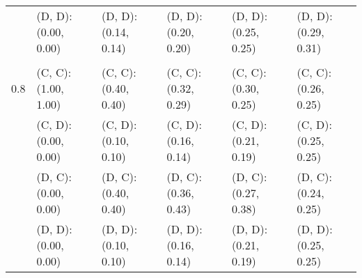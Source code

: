 \begin{tabular}{ l | l l l l l }
 & (D, D): (0.00, 0.00) & (D, D): (0.14, 0.14) & (D, D): (0.20, 0.20) & (D, D): (0.25, 0.25) & (D, D): (0.29, 0.31) \\ 
\\ 
0.8 & (C, C): (1.00, 1.00) & (C, C): (0.40, 0.40) & (C, C): (0.32, 0.29) & (C, C): (0.30, 0.25) & (C, C): (0.26, 0.25) \\ 
 & (C, D): (0.00, 0.00) & (C, D): (0.10, 0.10) & (C, D): (0.16, 0.14) & (C, D): (0.21, 0.19) & (C, D): (0.25, 0.25) \\ 
 & (D, C): (0.00, 0.00) & (D, C): (0.40, 0.40) & (D, C): (0.36, 0.43) & (D, C): (0.27, 0.38) & (D, C): (0.24, 0.25) \\ 
 & (D, D): (0.00, 0.00) & (D, D): (0.10, 0.10) & (D, D): (0.16, 0.14) & (D, D): (0.21, 0.19) & (D, D): (0.25, 0.25) \\ 
\end{tabular}


